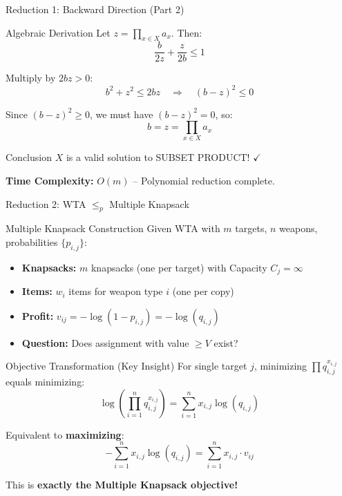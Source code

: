 \documentclass[aspectratio=43,8pt]{beamer}
\begin{document}
\begin{frame}{Reduction 1: Backward Direction (Part 2)}

\begin{exampleblock}{Algebraic Derivation}
Let $z = \prod_{x \in X} a_x$. Then:
$$\frac{b}{2z} + \frac{z}{2b} \leq 1$$

Multiply by $2bz > 0$:
$$b^2 + z^2 \leq 2bz \quad \Rightarrow \quad (b - z)^2 \leq 0$$

Since $(b-z)^2 \geq 0$, we must have $(b-z)^2 = 0$, so:
$$b = z = \prod_{x \in X} a_x$$
\end{exampleblock}

\begin{alertblock}{Conclusion}
$X$ is a valid solution to SUBSET PRODUCT! $\checkmark$

\textbf{Time Complexity:} $O(m)$ -- Polynomial reduction complete.
\end{alertblock}
\end{frame}

\begin{frame}{Reduction 2: WTA $\leq_p$ Multiple Knapsack}
\begin{block}{Multiple Knapsack Construction}
Given WTA with $m$ targets, $n$ weapons, probabilities $\{p_{i,j}\}$:
\begin{itemize}
    \item \textbf{Knapsacks:} $m$ knapsacks (one per target) with Capacity $C_j = \infty$
    \item \textbf{Items:} $w_i$ items for weapon type $i$ (one per copy)
    \item \textbf{Profit:} $v_{ij} = -\log(1 - p_{i,j}) = -\log(q_{i,j})$
    \item \textbf{Question:} Does assignment with value $\geq V$ exist?
\end{itemize}
\end{block}

\begin{exampleblock}{Objective Transformation (Key Insight)}
For single target $j$, minimizing $\prod q_{i,j}^{x_{i,j}}$ equals minimizing:
$$\log\left(\prod_{i=1}^n q_{i,j}^{x_{i,j}}\right) = \sum_{i=1}^n x_{i,j} \log(q_{i,j})$$

Equivalent to \textbf{maximizing}:
$$-\sum_{i=1}^n x_{i,j} \log(q_{i,j}) = \sum_{i=1}^n x_{i,j} \cdot v_{ij}$$

This is \textbf{exactly the Multiple Knapsack objective!}
\end{exampleblock}
\end{frame}
\end{document}
